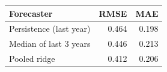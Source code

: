 \begin{tabular}{lrr}
\toprule
Forecaster & RMSE & MAE \\
\midrule
Persistence (last year) & 0.464 & 0.198 \\
Median of last 3 years & 0.446 & 0.213 \\
Pooled ridge & 0.412 & 0.206 \\
\bottomrule
\end{tabular}
